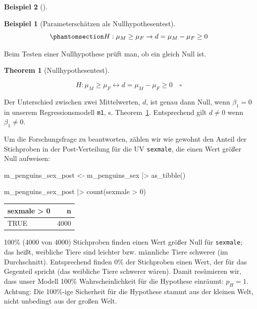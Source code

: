 \documentclass[
  ngerman,
  letterpaper,
  twoside,
  open=any]{scrbook}
\newenvironment{Shaded}{\begin{snugshade}}{\end{snugshade}}
\newcommand{\DecValTok}[1]{\textcolor[rgb]{0.68,0.00,0.00}{#1}}
\newcommand{\FunctionTok}[1]{\textcolor[rgb]{0.28,0.35,0.67}{#1}}
\newcommand{\NormalTok}[1]{\textcolor[rgb]{0.00,0.23,0.31}{#1}}
\newcommand{\OtherTok}[1]{\textcolor[rgb]{0.00,0.23,0.31}{#1}}
\newcommand{\SpecialCharTok}[1]{\textcolor[rgb]{0.37,0.37,0.37}{#1}}
\newcounter{none} %
\theoremstyle{definition}
\newtheorem{example}{Beispiel}[chapter]
\theoremstyle{plain}
\newtheorem{theorem}{Theorem}[chapter]
\theoremstyle{definition}
\theoremstyle{definition}
\theoremstyle{remark}
\begin{document}
\begin{example}[]
\begin{example}[Parameterschätzen als
Nullhypothesentest]
\begin{equation}\protect\phantomsection\label{eq-muf-mum}{H: \mu_M \ge \mu_F \rightarrow d = \mu_M - \mu_F \ge 0}\end{equation}

\end{example}

Beim Testen einer Nullhypothese prüft man, ob ein gleich Null ist.

\begin{theorem}[Nullhypothesentest]\protect\hypertarget{thm-muf-mum}{}\label{thm-muf-mum}

\[H: \mu_M \ge \mu_F \leftrightarrow d = \mu_M - \mu_F \ge 0\quad \square\]

\end{theorem}

Der Unterschied zwischen zwei Mittelwerten, \(d\), ist genau dann Null,
wenn \(\beta_1 = 0\) in unserem Regressionsmodell \texttt{m1}, s.
Theorem~\ref{thm-muf-mum}. Entsprechend gilt \(d \ne 0\) wenn
\(\beta_1 \ne 0\).

Um die Forschungsfrage zu beantworten, zählen wir wie gewohnt den Anteil
der Stichproben in der Post-Verteilung für die UV \texttt{sexmale}, die
einen Wert größer Null aufweisen:

\begin{Shaded}
\begin{Highlighting}[]
\NormalTok{m\_penguins\_sex\_post }\OtherTok{\textless{}{-}}
\NormalTok{  m\_penguins\_sex }\SpecialCharTok{|\textgreater{}} 
  \FunctionTok{as\_tibble}\NormalTok{()}

\NormalTok{m\_penguins\_sex\_post }\SpecialCharTok{|\textgreater{}} 
  \FunctionTok{count}\NormalTok{(sexmale }\SpecialCharTok{\textgreater{}} \DecValTok{0}\NormalTok{)}
\end{Highlighting}
\end{Shaded}

{\def\LTcaptype{none} %
\begin{longtable}[]{@{}lr@{}}
\toprule\noalign{}
sexmale \textgreater{} 0 & n \\
\midrule\noalign{}
\endhead
\bottomrule\noalign{}
\endlastfoot
TRUE & 4000 \\
\end{longtable}
}

100\% (4000 von 4000) Stichproben finden einen Wert größer Null für
\texttt{sexmale}; das heißt, weibliche Tiere sind leichter bzw.
männliche Tiere schwerer (im Durchschnitt). Entsprechend finden 0\% der
Stichproben einen Wert, der für das Gegenteil spricht (das weibliche
Tiere schwerer wären). Damit resümieren wir, dass unser Modell 100\%
Wahrscheinlichkeit für die Hypothese einräumt: \(p_H = 1\). Achtung: Die
100\%-ige Sicherheit für die Hypothese stammt aus der kleinen Welt,
nicht unbedingt aus der großen Welt.


\end{example}
\end{document}
